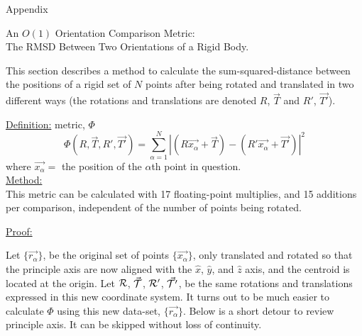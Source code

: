 


\begin{appendix}{Appendix}

\begin{center}
An $O(1)$ Orientation Comparison Metric:\\
The RMSD Between Two Orientations of a Rigid Body.
\end{center}

     This section describes a method to calculate the sum-squared-distance
between the positions of a rigid set of $N$ points after being
rotated and translated in two different ways
(the rotations and translations are denoted $R$, $\vec{T}$
and $R'$, $\vec{T'}$).

\underline{Definition:} metric, $\Phi$
\begin{equation}
\Phi(R,\vec{T}, R', \vec{T'}) =
\sum_{\alpha=1}^N
|
(R \vec{x_\alpha} + \vec{T}) -
(R' \vec{x_\alpha} + \vec{T'})
|^2 \label{def:phi}
\end{equation}
where $\vec{x_\alpha} = $ the position of the $\alpha$th point
in question.\\

\underline{Method:}\\
This metric can be calculated with 17 floating-point multiplies,
and 15 additions per comparison, independent of the number of points
being rotated.

\underline{Proof:}

Let $\{ \vec{r_\alpha} \}$,
be the original set of points $\{ \vec{x_\alpha} \}$,
only translated and rotated so that
the principle axis
are now aligned with the
$\hat{x}$, $\hat{y}$, and $\hat{z}$ axis,
and the centroid is located at the origin.
Let ${\cal R}$, $\vec{\cal T}$, ${\cal R'}$, $\vec{\cal T'}$,
be the same rotations and translations expressed in this new coordinate system.
It turns out to be much easier to calculate
$\Phi$ using this new data-set, $\{ \vec{r_\alpha} \}$.
Below is a short detour to review principle axis.
It can be skipped without loss of continuity.


\end{appendix}
